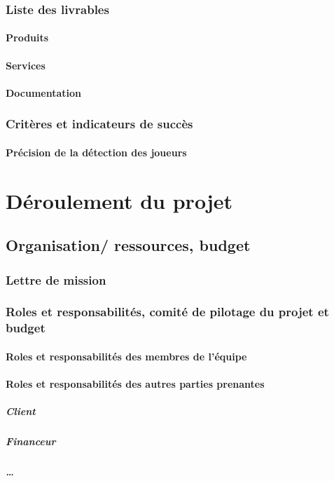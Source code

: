 \subsubsection{Liste des livrables}
\paragraph{Produits}
\paragraph{Services}
\paragraph{Documentation}
\subsubsection{Critères et indicateurs de succès}
\paragraph{Précision de la détection des joueurs}
\paragraph{}

\section{Déroulement du projet}
\subsection{Organisation/ ressources, budget}
\subsubsection{Lettre de mission}
\subsubsection{Roles et responsabilités, comité de pilotage du projet et budget}
\paragraph{Roles et responsabilités des membres de l'équipe}
\paragraph{Roles et responsabilités des autres parties prenantes}
    \subparagraph{Client}
    \subparagraph{Financeur}
    \subparagraph{\dots}
